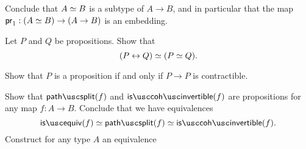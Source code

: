 \begin{exercises}
\begin{subexenum}
\end{subexenum}
Conclude that $\eqv{A}{B}$ is a subtype of $A\to B$, and in particular that the map $\proj 1 : (\eqv{A}{B})\to (A\to B)$ is an embedding.
\exercise \label{ex:prop_equiv}
\begin{subexenum}
\item \label{ex:equiv-bi-implication}Let $P$ and $Q$ be propositions. Show that
\begin{equation*}
\eqv{(P\leftrightarrow Q)}{(\eqv{P}{Q})}.
\end{equation*}
\item Show that $P$ is a proposition if and only if $P\to P$ is contractible.
\end{subexenum}
\exercise Show that $\pathsplit(f)$ and $\iscohinvertible(f)$ are propositions for any map $f:A\to B$. Conclude that we have equivalences
  \begin{equation*}
    \isequiv(f) \eqvsym \pathsplit(f) \eqvsym \iscohinvertible(f).
  \end{equation*}
\exercise \label{ex:idfunc_autohtpy}Construct for any type $A$ an equivalence

\end{exercises}
